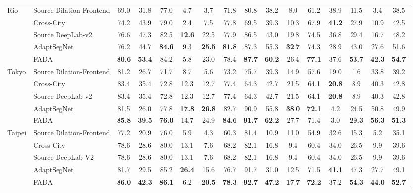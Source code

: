 \documentclass[runningheads]{llncs}
\begin{document}
\begin{table}[t]
{\begin{tabular}{l | l | c c c c c c c c c c c c c | c}
    \multirow{5}{*}{Rio} & Source Dilation-Frontend & 69.0& 31.8& 77.0& 4.7& 3.7& 71.8& 80.8& 38.2& 8.0& 61.2& 38.9& 11.5& 3.4 &38.5\\
    & Cross-City \cite{no_more_discrimination} & 74.2 & 43.9 & 79.0 & 2.4 & 7.5 & 77.8 & 69.5 & 39.3 & 10.3 & 67.9 & \textbf{41.2} & 27.9 & 10.9 & 42.5 \\
\cline{2-16}
    & Source DeepLab-v2 & 76.6 &47.3 &82.5& \textbf{12.6}& 22.5& 77.9& 86.5& 43.0& 19.8& 74.5& 36.8& 29.4& 16.7& 48.2\\
    & AdaptSegNet \cite{Tsai_adaptseg_2018}& 76.2 & 44.7 & \textbf{84.6} & 9.3 & \textbf{25.5} & \textbf{81.8} & 87.3 & 55.3 & \textbf{32.7} & 74.3 & 28.9 & 43.0 & 27.6 & 51.6 \\
& FADA & \textbf{80.6} & \textbf{53.4} & 84.2 & 5.8 &23.0 & 78.4& \textbf{87.7} & \textbf{60.2} & 26.4 & \textbf{77.1} & 37.6 & \textbf{53.7} & \textbf{42.3} & \textbf{54.7}\\
    \hline
    
    \multirow{5}{*}{Tokyo} 
    & Source Dilation-Frontend & 81.2& 26.7& 71.7& 8.7 &5.6& 73.2& 75.7& 39.3& 14.9& 57.6& 19.0& 1.6& 33.8& 39.2\\
    & Cross-City \cite{no_more_discrimination} & 83.4 & 35.4 & 72.8 & 12.3 & 12.7 & 77.4 & 64.3 & 42.7 & 21.5 & 64.1 & \textbf{20.8} & 8.9 & 40.3 & 42.8 \\
\cline{2-16}
    & Source DeepLab-v2 & 83.4& 35.4& 72.8& 12.3& 12.7& 77.4& 64.3& 42.7& 21.5& 64.1& \textbf{20.8}& 8.9& 40.3& 42.8\\
    & AdaptSegNet \cite{Tsai_adaptseg_2018}& 81.5 & 26.0 & 77.8 & \textbf{17.8} & \textbf{26.8} & 82.7 & 90.9 & 55.8 & \textbf{38.0} & \textbf{72.1} & 4.2 & 24.5 & 50.8 & 49.9\\
& FADA & \textbf{85.8} & \textbf{39.5} & \textbf{76.0} & 14.7 & 24.9 & \textbf{84.6} & \textbf{91.7} & \textbf{62.2} & 27.7 & 71.4 & 3.0 & \textbf{29.3} & \textbf{56.3} &\textbf{51.3} \\
    \hline
    
    \multirow{5}{*}{Taipei} 
    &Source Dilation-Frontend & 77.2& 20.9& 76.0& 5.9& 4.3& 60.3& 81.4& 10.9& 11.0& 54.9& 32.6& 15.3& 5.2& 35.1\\
    & Cross-City \cite{no_more_discrimination} & 78.6& 28.6& 80.0& 13.1& 7.6& 68.2& 82.1& 16.8& 9.4& 60.4& 34.0& 26.5& 9.9& 39.6 \\
\cline{2-16}
    & Source DeepLab-V2 & 78.6& 28.6& 80.0& 13.1& 7.6 &68.2 &82.1 &16.8 &9.4 &60.4 &34.0 &26.5 &9.9& 39.6\\
    & AdaptSegNet \cite{Tsai_adaptseg_2018} & 81.7& 29.5& 85.2& \textbf{26.4}& 15.6& 76.7& 91.7& 31.0& 12.5& 71.5& \textbf{41.1}& 47.3& 27.7& 49.1\\
& FADA &\textbf{86.0} & \textbf{42.3} & \textbf{86.1} & 6.2 & \textbf{20.5} & \textbf{78.3} & \textbf{92.7} & \textbf{47.2} & \textbf{17.7} &\textbf{72.2} & 37.2 & \textbf{54.3} & \textbf{44.0}&\textbf{52.7}\\
    \hline
    \end{tabular}}
    
    \label{tab:crosscity_table}
\end{table}
\end{document}
